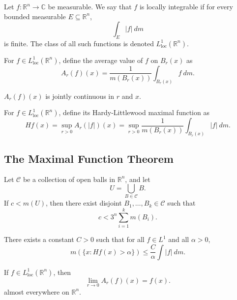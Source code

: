 \documentclass[11pt]{article}
\renewcommand{\C}{\mathbb{C}}
\newcommand{\R}{\mathbb{R}}
\newcommand{\Lloc}{L^1_\text{loc}}
\theoremstyle{definition}
\theoremstyle{remark}
\begin{document}
    \begin{definition}
        Let $f\colon \R^n \to \C$ be measurable. We say that $f$ is locally
        integrable if for every bounded measurable $E \subseteq \R^n$, \[
            \int_E |f|\:dm
        \] is finite. The class of all such functions is denoted
        $\Lloc(\R^n)$.
    \end{definition}

    \begin{definition}
        For $f \in \Lloc(\R^n)$, define the average value of $f$ on $B_r(x)$ as \[
            A_r(f)(x) = \frac{1}{m(B_r(x))} \int_{B_r(x)} f\:dm.
        \]
    \end{definition}

    \begin{lemma}
        $A_r(f)(x)$ is jointly continuous in $r$ and $x$.
    \end{lemma}

    \begin{definition}
        For $f \in \Lloc(\R^n)$, define its Hardy-Littlewood maximal function as \[
            Hf(x) = \sup_{r > 0} A_r(|f|)(x) = \sup_{r > 0} \frac{1}{m(B_r(x))}
            \int_{B_r(x)} |f|\:dm.
        \]
    \end{definition}


    \subsection{The Maximal Function Theorem}

    \begin{lemma}
        Let $\mathscr{C}$ be a collection of open balls in $\R^n$, and let \[
            U = \bigcup_{B \in \mathscr{C}} B.
        \] If $c < m(U)$, then there exist disjoint $B_1, \dots, B_k \in \mathscr{C}$
        such that \[
            c < 3^n \sum_{i = 1}^k m(B_i).
        \]
    \end{lemma}

    \begin{theorem}
        There exists a constant $C > 0$ such that for all $f \in L^1$ and all $\alpha
        > 0$, \[
            m(\{x : Hf(x) > \alpha\}) \leq \frac{C}{\alpha} \int |f| \:dm.
        \]
    \end{theorem}

    \begin{theorem}
        If $f \in \Lloc(\R^n)$, then \[
            \lim_{r \to 0} A_r(f)(x) = f(x).
        \] almost everywhere on $\R^n$.
    \end{theorem}
\end{document}
